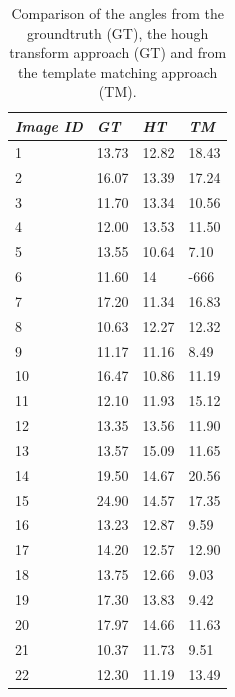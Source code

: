 \documentclass[10pt,twocolumn,letterpaper]{article}
\begin{document}
\begin{table}
\begin{center}
\begin{tabular}{| l | l | l | l |}
  \hline
  \emph{Image ID} & \emph{GT} & \emph{HT} & \emph{TM} \\ \hline
  1 & 13.73 & 12.82 & 18.43 \\ \hline
  2 & 16.07 & 13.39 & 17.24 \\ \hline
  3 & 11.70 & 13.34 & 10.56 \\ \hline
  4 & 12.00 & 13.53 & 11.50 \\ \hline
  5 & 13.55 & 10.64 & 7.10 \\ \hline
  6 & 11.60 & 14 & -666 \\ \hline
  7 & 17.20 & 11.34 & 16.83 \\ \hline
  8 & 10.63 & 12.27 & 12.32 \\ \hline
  9 & 11.17 & 11.16 & 8.49 \\ \hline
  10 & 16.47 & 10.86 & 11.19 \\ \hline
  11 & 12.10 & 11.93 & 15.12 \\ \hline
  12 & 13.35 & 13.56 & 11.90 \\ \hline
  13 & 13.57 & 15.09 & 11.65 \\ \hline
  14 & 19.50 & 14.67 & 20.56 \\ \hline
  15 & 24.90 & 14.57 & 17.35 \\ \hline
  16 & 13.23 & 12.87 & 9.59 \\ \hline
  17 & 14.20 & 12.57 & 12.90 \\ \hline
  18 & 13.75 & 12.66 & 9.03 \\ \hline
  19 & 17.30 & 13.83 & 9.42 \\ \hline
  20 & 17.97 & 14.66 & 11.63 \\ \hline
  21 & 10.37 & 11.73 & 9.51 \\ \hline
  22 & 12.30 & 11.19 & 13.49 \\ \hline
\end{tabular}
\caption{Comparison of the angles from the groundtruth (GT), the hough transform approach (GT) and from the template matching approach (TM).}
\label{tab:results}
\end{center}
\end{table}
\end{document}
